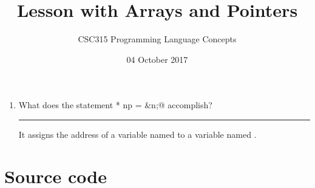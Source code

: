 \documentclass[twoside]{article}
\title{Lesson with Arrays and Pointers}
\author{CSC315 Programming Language Concepts}
\date{04 October 2017}
\newenvironment{answer}
  { \vspace*{12pt}

    \rule{12cm}{0.02cm}

    \vspace*{12pt}

    \hspace*{1.0cm}
    \begin{minipage}{10cm}}
  {\end{minipage} \vspace*{12pt}}
\begin{document}
\maketitle

\begin{enumerate}
  \item What does the statement \lstinline@int* np = &n;@ accomplish?

  \begin{answer}
    It assigns the address of a variable named \lstinline@n@ to 
    a variable named \lstinline@np@.
    \end{answer}

  \end{enumerate}

\section{Source code}
\end{document}
